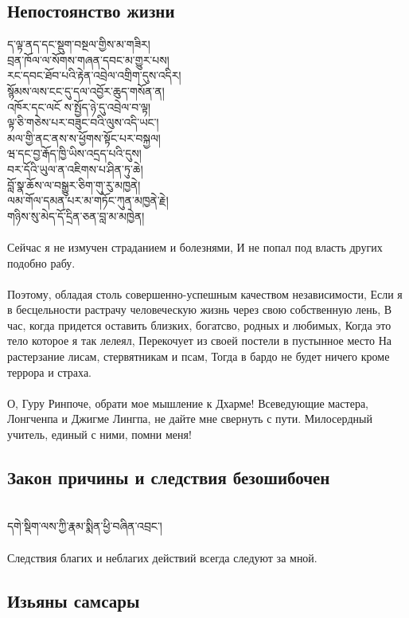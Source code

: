\subsection{Непостоянство жизни}
\ti
ད་ལྟ་ནད་དང་སྡུག་བསྔལ་གྱིས་མ་གཟིར།\\
བྲན་ཁོལ་ལ་སོགས་གཞན་དབང་མ་གྱུར་པས།\\
རང་དབང་ཐོབ་པའི་རྟེན་འབྲེལ་འགྲིག་དུས་འདིར།\\
སྙོམས་ལས་ངང་དུ་དལ་འབྱོར་ཆུད་གསོན་ན།\\
འཁོར་དང་ལངོ ས་སྤྱོད་ཉེ་དུ་འབྲེལ་བ་ལྟ།\\
ལྟ་ཅི་གཅེས་པར་བཟུང་བའི་ལུས་འདི་ཡང་།\\
མལ་གྱི་ནང་ནས་ས་ཕྱོགས་སྟོང་པར་བསྐྱལ།\\
ཝ་དང་བྱ་རྒོད་ཁྱི་ཡིས་འདྲད་པའི་དུས།\\
བར་དོའི་ཡུལ་ན་འཇིགས་པ་ཤིན་ཏུ་ཆེ།\\
བློ་སྣ་ཆོས་ལ་བསྒྱུར་ཅིག་གུ་རུ་མཁྱནེ།\\
ལམ་གོལ་དམན་པར་མ་གཏོང་ཀུན་མཁྱནེ་རྗེ།\\
གཉིས་སུ་མེད་དོ་དྲིན་ཅན་བླ་མ་མཁྱེན།\\
\\
\ru
Сейчас я не измучен страданием и болезнями,
И не попал под власть других подобно рабу.\\
\\
Поэтому, обладая столь совершенно-успешным качеством независимости,
Если я в бесцельности растрачу человеческую жизнь через свою собственную лень,
В час, когда придется оставить близких, богатсво, родных и любимых,
Когда это тело которое я так лелеял,
Перекочует из своей постели в пустынное место
На растерзание лисам, стервятникам и псам,
Тогда в бардо не будет ничего кроме террора и страха.\\
\\
О, Гуру Ринпоче, обрати мое мышление к Дхарме!
Всеведующие мастера, Лонгченпа и Джигме Лингпа,
не дайте мне свернуть с пути. Милосердный учитель,
единый с ними, помни меня!

\newpage
\subsection{Закон причины и следствия безошибочен}
\\
\ti
དགེ་སྡིག་ལས་ཀྱི་རྣམ་སྨིན་ཕྱི་བཞིན་འབྲང་།\\
\\
\ru
Следствия благих и неблагих действий всегда следуют за мной.

\subsection{Изьяны самсары}

